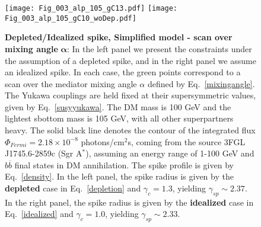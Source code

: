 \documentclass[11pt]{article}
\begin{document}
  \begin{figure}[ht]
  \centering
  {\texttt{[image: Fig\_003\_alp\_105\_gC13.pdf]}}\hspace{2mm}
  {\texttt{[image: Fig\_003\_alp\_105\_gC10\_woDep.pdf]}}
    \caption{\textbf{Depleted/Idealized spike, Simplified model - scan over mixing angle} $\mathbf{\alpha}$:  In the left panel we present the constraints under the assumption of a depleted spike, and in the right panel we assume an idealized spike.  In each case, the green points correspond to a scan over the mediator mixing angle $\alpha$ defined by Eq.~\ref{mixingangle}. The Yukawa couplings are held fixed at their supersymmetric values, given by Eq.~\ref{susyyukawa}. The DM mass is 100 GeV and the lightest sbottom mass is 105 GeV, with all other superpartners heavy.  The solid black line denotes the contour of the integrated flux $\Phi_{Fermi} = 2.18 \times 10^{-8}$ photons/cm$^2$s, coming from the source 3FGL J1745.6-2859c (Sgr A$^*$), assuming an energy range of 1-100 GeV and $b \overline{b}$ final states in DM annihilation.   The spike profile is given by Eq.~\ref{density}. In the left panel, the spike radius is given by the \textbf{depleted} case in Eq.~\ref{depletion} and $\gamma_c  = 1.3$,  yielding $\gamma_{sp} \sim 2.37$.  In the right panel, the spike radius is given by the \textbf{idealized} case in Eq.~\ref{idealized} and $\gamma_c  = 1.0$, yielding $\gamma_{sp} \sim 2.33$.
    \label{simpc0c1}}
\end{figure}

\end{document}
